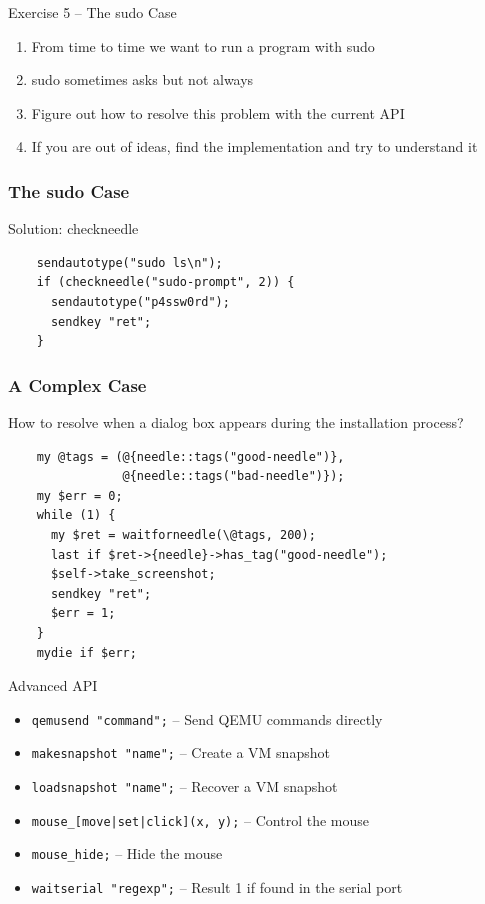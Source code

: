 \documentclass{beamer}
\begin{document}
%
%
\begin{frame}{Exercise 5 -- The sudo Case}
  \begin{enumerate}
  \item From time to time we want to run a program with sudo
  \item sudo sometimes asks but not always
  \item Figure out how to resolve this problem with the current API
  \item If you are out of ideas, find the implementation and try to understand it
  \end{enumerate}
\end{frame}


\begin{frame}[fragile]
  \frametitle{The sudo Case}
  Solution: checkneedle
  \lstset{style=myperl}
  \begin{lstlisting}
    sendautotype("sudo ls\n");
    if (checkneedle("sudo-prompt", 2)) {
      sendautotype("p4ssw0rd");
      sendkey "ret";
    }
  \end{lstlisting}
\end{frame}

\begin{frame}[fragile]
  \frametitle{A Complex Case}
  How to resolve when a dialog box appears during the installation process?
  \lstset{style=myperl}
  \begin{lstlisting}
    my @tags = (@{needle::tags("good-needle")},
                @{needle::tags("bad-needle")});
    my $err = 0;
    while (1) {
      my $ret = waitforneedle(\@tags, 200);
      last if $ret->{needle}->has_tag("good-needle");
      $self->take_screenshot;
      sendkey "ret";
      $err = 1;
    }
    mydie if $err;
  \end{lstlisting}
\end{frame}


\begin{frame}{Advanced API}
  \begin{itemize}
  \item \texttt{qemusend "command";} -- Send QEMU commands directly
  \item \texttt{makesnapshot "name";} -- Create a VM snapshot
  \item \texttt{loadsnapshot "name";} -- Recover a VM snapshot
  \item \texttt{mouse\_[move|set|click](x, y);} -- Control the mouse
  \item \texttt{mouse\_hide;} -- Hide the mouse
  \item \texttt{waitserial "regexp";} -- Result 1 if found in the serial port
  \end{itemize}
\end{frame}
\end{document}
